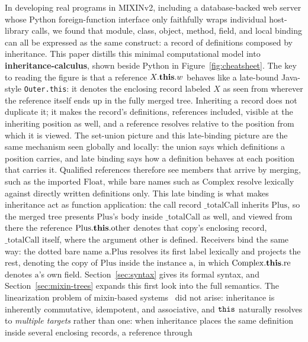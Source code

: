 In developing real programs in MIXINv2, including a database-backed web server whose Python foreign-function interface only faithfully wraps individual host-library calls, we found that module, class, object, method, field, and local binding can all be expressed as the same construct: a record of definitions composed by inheritance. This paper distills this minimal computational model into \textbf{inheritance-calculus}, shown beside Python in Figure~\ref{fig:cheatsheet}.
The key to reading the figure is that a reference
$X.\mathbf{this}.w$ behaves like a late-bound Java-style
\texttt{Outer.this}: it denotes the enclosing record labeled $X$ as
seen from wherever the reference itself ends up in the fully merged
tree.
Inheriting a record does not duplicate it; it makes the record's
definitions, references included, visible at the inheriting position
as well, and a reference resolves relative to the position from which
it is viewed.
The set-union picture and this late-binding picture are the same
mechanism seen globally and locally: the union says which definitions
a position carries, and late binding says how a definition behaves at
each position that carries it.
Qualified references therefore see members that arrive by merging,
such as the imported $\mathrm{Float}$, while bare names such as
$\mathrm{Complex}$ resolve lexically against directly written
definitions only.
This late binding is what makes inheritance act as function
application: the call record $\mathrm{\_totalCall}$ inherits
$\mathrm{Plus}$, so the merged tree presents
$\mathrm{Plus}$'s body inside $\mathrm{\_totalCall}$ as well, and
viewed from there the reference
$\mathrm{Plus}.\mathbf{this}.\mathrm{other}$
denotes that copy's enclosing record, $\mathrm{\_totalCall}$ itself,
where the argument $\mathrm{other}$ is defined.
Receivers bind the same way: the dotted bare name
$\mathrm{a}.\mathrm{Plus}$ resolves its first label lexically and
projects the rest, denoting the copy of $\mathrm{Plus}$ inside the
instance $\mathrm{a}$, in which
$\mathrm{Complex}.\mathbf{this}.\mathrm{re}$ denotes
$\mathrm{a}$'s own field.
Section~\ref{sec:syntax} gives its formal syntax, and
Section~\ref{sec:mixin-trees} expands this first look into the full
semantics.
The linearization problem of mixin-based
systems~\cite{bracha1990-mixin-inheritance,barrett1996-c3-linearization}
did not arise: inheritance is inherently commutative, idempotent,
and associative, and $\mathtt{this}$ naturally resolves to
\emph{multiple targets} rather than one: when inheritance places the
same definition inside several enclosing records, a reference through
